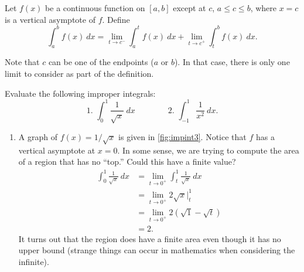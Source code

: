 \begin{definition}\label{def:imp_int2}
Let $f(x)$ be a continuous function on $[a,b]$ except at $c$, $a\leq c\leq b$, where $x=c$ is a vertical asymptote of $f$. Define
\[\int_a^b f(x)\ dx = \lim_{t\to c^-}\int_a^t f(x)\ dx + \lim_{t\to c^+}\int_t^b f(x)\ dx.\]
\end{definition}

Note that $c$ can be one of the endpoints ($a$ or $b$). In that case, there is only one limit to consider as part of the definition.

\begin{example}\label{ex_impint3}
Evaluate the following improper integrals:
\[
 \text{1. }\int_0^1\frac1{\sqrt{x}}\ dx\qquad\qquad
 \text{2. }\int_{-1}^1\frac{1}{x^2}\ dx.
\]
\solution
\begin{enumerate}
\item		A graph of $f(x) = 1/\sqrt{x}$ is given in \autoref{fig:impint3}.
%
%
Notice that $f$ has a vertical asymptote at $x=0$. In some sense, we are trying to compute the area of a region that has no ``top.'' Could this have a finite value? 
\begin{align*}
	\int_0^1 \frac{1}{\sqrt{x}}\ dx
	&= \lim_{t\to0^+}\int_t^1 \frac1{\sqrt{x}}\ dx \\
	&= \lim_{t\to0^+} 2\sqrt{x}\Big|_t^1 \\
	&= \lim_{t\to0^+} 2\left(\sqrt{1}-\sqrt{t}\right)\\
	&=	2.
\end{align*}
It turns out that the region does have a finite area even though it has no upper bound (strange things can occur in mathematics when considering the infinite).


\end{enumerate}
\end{example}
